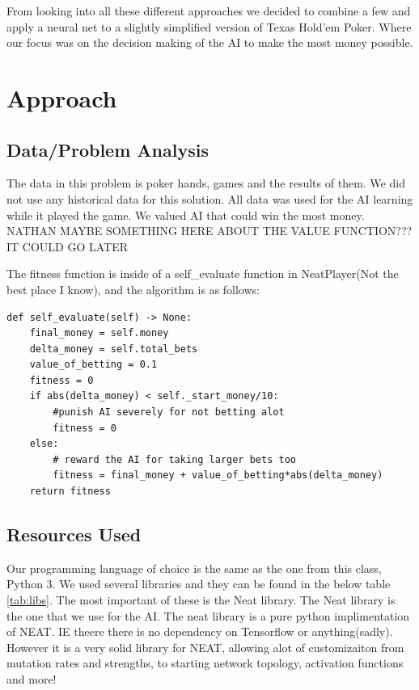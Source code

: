 From looking into all these different approaches we decided to combine a few and apply a neural net to a slightly simplified version of Texas Hold'em Poker. Where our focus was on the decision making of the AI to make the most money possible.

\section{Approach}
\subsection{Data/Problem Analysis}
The data in this problem is poker hands, games and the results of them. We did not use any historical data for
this solution. All data was used for the AI learning while it played the game. We valued AI that could win the
most money. NATHAN MAYBE SOMETHING HERE ABOUT THE VALUE FUNCTION??? IT COULD GO LATER

The fitness function is inside of a self\_evaluate function in NeatPlayer(Not the best place I know), and the
algorithm is as follows: 
\begin{verbatim}
def self_evaluate(self) -> None:
    final_money = self.money
    delta_money = self.total_bets
    value_of_betting = 0.1
    fitness = 0
    if abs(delta_money) < self._start_money/10:
        #punish AI severely for not betting alot
        fitness = 0
    else:
        # reward the AI for taking larger bets too
        fitness = final_money + value_of_betting*abs(delta_money)
    return fitness
\end{verbatim}


\subsection{Resources Used}
Our programming language of choice is the same as the one from this class, Python 3. We used several libraries
and they can be found in the below table \autoref{tab:libs}. The most important of these is the Neat library.
The Neat library is the one that we use for the AI. The neat library is a pure python implimentation of NEAT.
IE theere there is no dependency on Tensorflow or anything(sadly). However it is a very solid library for NEAT,
allowing alot of customizaiton from mutation rates and strengths, to starting network topology, activation
functions and more!

